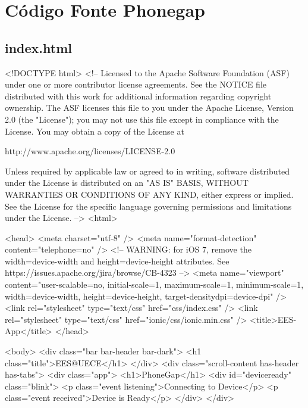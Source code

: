\chapter{Código Fonte Phonegap} %
\label{cha:c_digo_fonte_phonegap}

\section{index.html} %
\label{sec:index_html}


<!DOCTYPE html>
<!--
    Licensed to the Apache Software Foundation (ASF) under one
    or more contributor license agreements.  See the NOTICE file
    distributed with this work for additional information
    regarding copyright ownership.  The ASF licenses this file
    to you under the Apache License, Version 2.0 (the
    "License"); you may not use this file except in compliance
    with the License.  You may obtain a copy of the License at

    http://www.apache.org/licenses/LICENSE-2.0

    Unless required by applicable law or agreed to in writing,
    software distributed under the License is distributed on an
    "AS IS" BASIS, WITHOUT WARRANTIES OR CONDITIONS OF ANY
     KIND, either express or implied.  See the License for the
    specific language governing permissions and limitations
    under the License.
-->
<html>

<head>
    <meta charset="utf-8" />
    <meta name="format-detection" content="telephone=no" />
    <!-- WARNING: for iOS 7, remove the width=device-width and height=device-height attributes. See https://issues.apache.org/jira/browse/CB-4323 -->
    <meta name="viewport" content="user-scalable=no, initial-scale=1, maximum-scale=1, minimum-scale=1, width=device-width, height=device-height, target-densitydpi=device-dpi" />
    <link rel="stylesheet" type="text/css" href="css/index.css" />
    <link rel="stylesheet" type="text/css" href="ionic/css/ionic.min.css" />
    <title>EES-App</title>
</head>

<body>
    <div class="bar bar-header bar-dark">
        <h1 class="title">EES@UECE</h1>
    </div>
    <div class="scroll-content has-header has-tabs">
        <div class="app">
            <h1>PhoneGap</h1>
            <div id="deviceready" class="blink">
                <p class="event listening">Connecting to Device</p>
                <p class="event received">Device is Ready</p>
            </div>
        </div>

